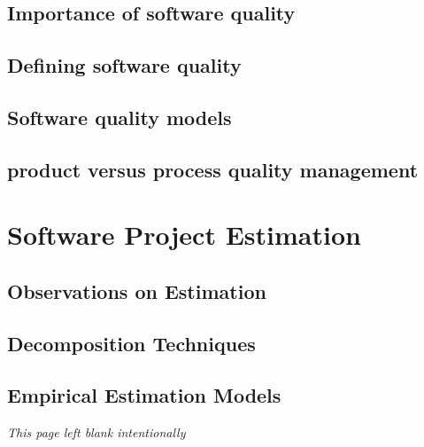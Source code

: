\documentclass{article}
\begin{document}
	\subsection{Importance of software quality}
	\subsection{Defining software quality}
	\subsection{Software quality models}
	\subsection{product versus process quality management}

	\section{Software Project Estimation}
	\subsection{Observations on Estimation}
	\subsection{Decomposition Techniques}
	\subsection{Empirical Estimation Models}

	\newpage \thispagestyle{empty}
	\vspace*{\fill}
		\centering \emph{\large This page left blank intentionally}
	\vspace*{\fill}
\end{document}
